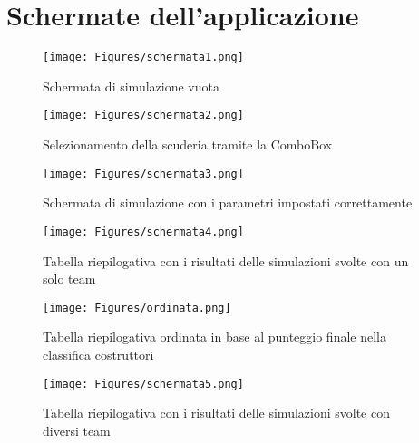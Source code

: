 \chapter{Schermate dell'applicazione}


\begin{figure}[h!]
    \centering    
        \texttt{[image: Figures/schermata1.png]}
        \caption{Schermata di simulazione vuota}
        \label{fig:schermata_simulazione_vuota}
\end{figure}
\begin{figure}[h!]
        \texttt{[image: Figures/schermata2.png]}
        \caption{Selezionamento della scuderia tramite la ComboBox}
        \label{fig:selezionamento_scuderia}
\end{figure}

\begin{figure}[h!]
    \centering
    \texttt{[image: Figures/schermata3.png]}
    \caption{Schermata di simulazione con i parametri impostati correttamente}
    \label{fig:schermata_simulazione_parametri}
\end{figure}

\begin{figure}[h!]
    \centering
        \texttt{[image: Figures/schermata4.png]}
        \caption{Tabella riepilogativa con i risultati delle simulazioni svolte con un solo team}
        \label{fig:tabella_riepilogativa_singolo_team}
    \hspace{1cm}
        \texttt{[image: Figures/ordinata.png]}
        \caption{Tabella riepilogativa ordinata in base al punteggio finale nella classifica costruttori}
        \label{fig:tabella_riepilogativa_ordine_punteggio}
\end{figure}

\begin{figure}[h!]
    \centering
    \texttt{[image: Figures/schermata5.png]}
    \caption{Tabella riepilogativa con i risultati delle simulazioni svolte con diversi team}
    \label{fig:tabella_riepilogativa_diversi_team}
\end{figure}



